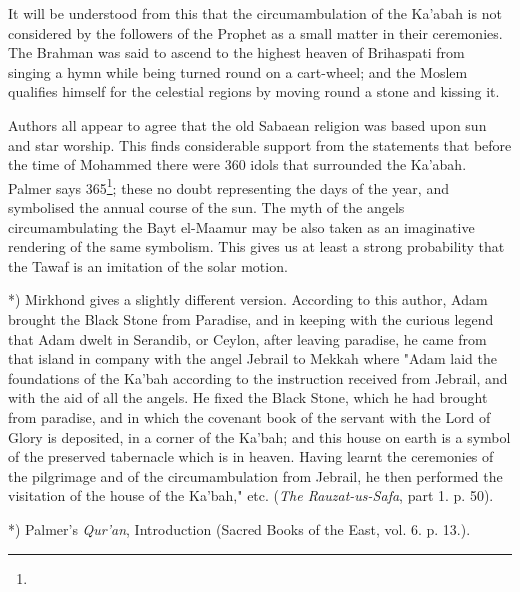 \documentclass[a4paper, 11pt, oneside, polutonikogreek, english]{article}
\begin{document}
It will be understood from this that the circumambulation of the Ka'abah is not considered by the followers of the Prophet as a small matter in their ceremonies. The Brahman was said to ascend to the highest heaven of Brihaspati from singing a hymn while being turned round on a cart-wheel; and the Moslem qualifies himself for the celestial regions by moving round a stone and kissing it.

Authors all appear to agree that the old Sabaean religion was based upon sun and star worship. This finds considerable support from the statements that before the time of Mohammed there were 360 idols that surrounded the Ka'abah. Palmer says 365\footnote{}; these no doubt representing the days of the year, and symbolised the annual course of the sun. The myth of the angels circumambulating the Bayt el-Maamur may be also taken as an imaginative rendering of the same symbolism. This gives us at least a strong probability that the Tawaf is an imitation of the solar motion.

*) Mirkhond gives a slightly different version. According to this author, Adam brought the Black Stone from Paradise, and in keeping with the curious legend that Adam dwelt in Serandib, or Ceylon, after leaving paradise, he came from that island in company with the angel Jebrail to Mekkah where "Adam laid the foundations of the Ka'bah according to the instruction received from Jebrail, and with the aid of all the angels. He fixed the Black Stone, which he had brought from paradise, and in which the covenant book of the servant with the Lord of Glory is deposited, in a corner of the Ka'bah; and this house on earth is a symbol of the preserved tabernacle which is in heaven. Having learnt the ceremonies of the pilgrimage and of the circumambulation from Jebrail, he then performed the visitation of the house of the Ka'bah," etc. (\emph{The Rauzat-us-Safa}, part 1. p. 50).

*) Palmer's \emph{Qur'an}, Introduction (Sacred Books of the East, vol. 6. p. 13.).
\end{document}
